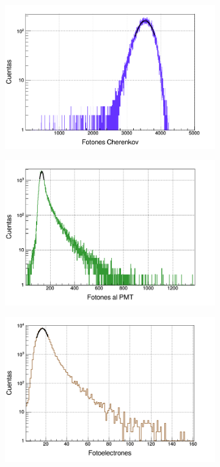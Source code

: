\documentclass[12pt,oneside,openany,letter]{book}
\begin{document}
\begin{figure}[h!]
    \centering
    \begin{subfigure}{0.45\textwidth}
        \includegraphics[width=\textwidth]{images/cherenkov_total_e.png}
        \caption{}
        \label{cherenkov_total_e}
    \end{subfigure}
    \begin{subfigure}{0.45\textwidth}
        \includegraphics[width=\textwidth]{images/al_pmt_e.png}
        \caption{}
        \label{al_pmt_e}
    \end{subfigure}
    \begin{subfigure}{0.45\textwidth}
        \includegraphics[width=\textwidth]{images/fotoelectrones_vee.png}

\end{subfigure}
\end{figure}
\end{document}
